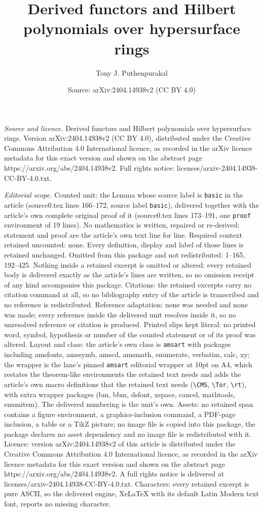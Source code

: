 \documentclass[10pt,a4paper]{amsart}
\title[Derived functors and Hilbert polynomials over hypersurface r]{Derived functors and Hilbert polynomials over hypersurface rings}
\author{Tony J. Puthenpurakal}
\date{Source: arXiv:2404.14938v2 (CC BY 4.0)}
\begin{document}
\maketitle

\noindent\emph{Source and licence.} Derived functors and Hilbert polynomials over hypersurface rings. Version arXiv:2404.14938v2 (CC BY 4.0), distributed under the Creative Commons Attribution 4.0 International licence, as recorded in the arXiv licence metadata for this exact version and shown on the abstract page https://arxiv.org/abs/2404.14938v2. Full rights notice: licenses/arxiv-2404.14938-CC-BY-4.0.txt.\par\smallskip

\noindent\textit{Editorial scope.} Counted unit: the Lemma whose source label is \texttt{basic} in the article (source0.tex lines 166--172, source label \texttt{basic}), delivered together with the article's own complete original proof of it (source0.tex lines 173--191, one \texttt{proof} environment of 19 lines). No mathematics is written, repaired or re-derived: statement and proof are the article's own text line for line. Required context retained uncounted: none. Every definition, display and label of those lines is retained unchanged. Omitted from this package and not redistributed: 1--165, 192--425. Nothing inside a retained excerpt is omitted or altered: every retained body is delivered exactly as the article's lines are written, so no omission receipt of any kind accompanies this package. Citations: the retained excerpts carry no citation command at all, so no bibliography entry of the article is transcribed and no reference is redistributed. Reference adaptation: none was needed and none was made; every reference inside the delivered unit resolves inside it, so no unresolved reference or citation is produced. Printed slips kept literal: no printed word, symbol, hypothesis or number of the counted statement or of its proof was altered. Layout and class: the article's own class is \texttt{amsart} with packages including amsfonts, amssymb, amscd, amsmath, enumerate, verbatim, calc, xy; the wrapper is the lane's pinned \texttt{amsart} editorial wrapper at 10pt on A4, which restates the theorem-like environments the retained text needs and adds the article's own macro definitions that the retained text needs (\texttt{\textbackslash CMS}, \texttt{\textbackslash Tor}, \texttt{\textbackslash rt}), with extra wrapper packages (bm, bbm, dsfont, xspace, cancel, mathtools, enumitem). The delivered numbering is the unit's own. Assets: no retained span contains a figure environment, a graphics-inclusion command, a PDF-page inclusion, a table or a TikZ picture; no image file is copied into this package, the package declares no asset dependency and no image file is redistributed with it. Licence: version arXiv:2404.14938v2 of this article is distributed under the Creative Commons Attribution 4.0 International licence, as recorded in the arXiv licence metadata for this exact version and shown on the abstract page https://arxiv.org/abs/2404.14938v2. A full rights notice is delivered at licenses/arxiv-2404.14938-CC-BY-4.0.txt. Characters: every retained excerpt is pure ASCII, so the delivered engine, XeLaTeX with its default Latin Modern text font, reports no missing character.
\end{document}
